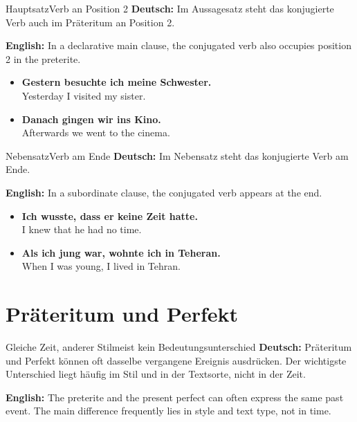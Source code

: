 \documentclass[a4paper,11pt]{article}
\newcommand{\GermanText}[1]{\textbf{Deutsch: }#1\par}
\newcommand{\EnglishText}[1]{{\small\color{SoftGray}\textbf{English: }#1\par}}
\newcommand{\ExampleItem}[2]{\item \textbf{#1}\\{\small\color{SoftGray}#2}}
\begin{document}
        \begin{grammarentry}{Hauptsatz}{Verb an Position 2}
            \GermanText{Im Aussagesatz steht das konjugierte Verb auch im Präteritum an Position 2.}
            \EnglishText{In a declarative main clause, the conjugated verb also occupies position 2 in the preterite.}
        \end{grammarentry}
        
        \begin{exbox}
            \begin{itemize}
                \ExampleItem{Gestern besuchte ich meine Schwester.}{Yesterday I visited my sister.}
                \ExampleItem{Danach gingen wir ins Kino.}{Afterwards we went to the cinema.}
            \end{itemize}
        \end{exbox}
        
        \begin{grammarentry}{Nebensatz}{Verb am Ende}
            \GermanText{Im Nebensatz steht das konjugierte Verb am Ende.}
            \EnglishText{In a subordinate clause, the conjugated verb appears at the end.}
        \end{grammarentry}
        
        \begin{exbox}
            \begin{itemize}
                \ExampleItem{Ich wusste, dass er keine Zeit hatte.}{I knew that he had no time.}
                \ExampleItem{Als ich jung war, wohnte ich in Teheran.}{When I was young, I lived in Tehran.}
            \end{itemize}
        \end{exbox}
    
    
    \section{Präteritum und Perfekt}
        
        \begin{grammarentry}{Gleiche Zeit, anderer Stil}{meist kein Bedeutungsunterschied}
            \GermanText{Präteritum und Perfekt können oft dasselbe vergangene Ereignis ausdrücken. Der wichtigste Unterschied liegt häufig im Stil und in der Textsorte, nicht in der Zeit.}
            \EnglishText{The preterite and the present perfect can often express the same past event. The main difference frequently lies in style and text type, not in time.}
        \end{grammarentry}
        
\end{document}
